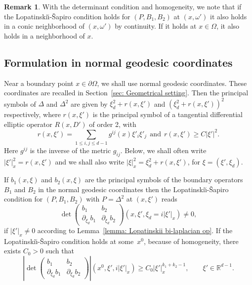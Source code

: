 \documentclass[10pt]{amsart}
\theoremstyle{plain}
\theoremstyle{definition}
\newtheorem{remark}[theorem]{Remark}
\def\R{\mathbb{R}}
\newcommand{\LS}{Lopatinski\u{\i}-\v{S}apiro\xspace}
\begin{document}
\begin{remark}\label{RR0}
With the determinant condition and homogeneity, we note that if the
\LS condition holds for $(P,B_1, B_2)$ at $(x,\omega')$ it also holds
in a conic neighborhood of $(x,\omega')$ by continuity. If it holds at $x\in\Omega$, it also holds in a neighborhood of $x$.
\end{remark}

\subsection{Formulation in normal geodesic coordinates}
Near a boundary point $x\in\partial\Omega$, we shall use normal
geodesic coordinates. These coordinates are recalled in
Section~\ref{sec: Geometrical setting}. Then the principal symbols of $\Delta$ and
$\Delta^2$ are given by $\xi_d^2+r(x,\xi')$ and
$(\xi_d^2+r(x,\xi'))^2$ respectively, where $r(x,\xi')$ is the
principal symbol of a tangential differential elliptic operator
$R(x,D')$ of order 2, with
\[
r(x,\xi')=\sum_{1\leq i,j\leq
d-1}g^{ij}(x)\xi'_i\xi'_j \ \ \text{and} \ \ r(x,\xi')\geq C|\xi'|^2.
\]
Here $g^{ij}$ is the inverse of the metric $g_{ij}$. Below, we shall
often write $|\xi'|^2_x=r(x,\xi')$ and we shall also write
$|\xi|^2_x=\xi_d^2+r(x,\xi')$, for $\xi=(\xi',\xi_d)$.

If $b_1(x,\xi)$ and $b_2(x,\xi)$ are the principal symbols of the
boundary operators $B_1$ and $B_2$ in the normal geodesic
coordinates then the \LS condition for $(P, B_1, B_2)$ with $P =
\Delta^2$ at $(x,\xi')$ reads
\begin{equation*}
\det
\begin{pmatrix}
b_1&b_2\\[
2pt]
\partial_{\xi_d}b_1& \partial_{\xi_d}b_2
\end{pmatrix}(x,\xi',\xi_d=i |\xi'|_x)
\neq 0,
\end{equation*}
if $|\xi'|_x \neq 0$ according to Lemma~\ref{lemma: Lopatinskii bi-laplacian op}. If the \LS condition holds at some~$x^0$,
because of homogeneity, there exists $C_0>0$ such that
\begin{equation}\label{eq: homog formul LS condition}
\left|\det
\begin{pmatrix}
b_1 &b_2\\[
2pt]
\partial_{\xi_d}b_1& \partial_{\xi_d}b_2
\end{pmatrix}\right|(x^0,\xi',i |\xi'|_x)
\geq C_0 |\xi'|_x^{k_1+k_2 -1},
\qquad \xi' \in \R^{d-1}.
\end{equation}
\end{document}
